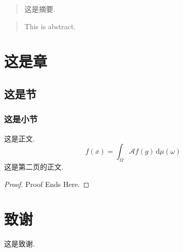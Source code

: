 \documentclass[oneside]{fduthesis2023}
\begin{document}
  \takeCareOfPageNumbers %

  \begin{abstract}
    这是摘要.
  \end{abstract}
  
  \changeToEnglishAbstract
  \begin{abstract}
    This is abstract.
  \end{abstract}

  \makeTableOfContents %

  \startMainPart
  \chapter{这是章}
    \section{这是节}
      \subsection{这是小节}
        这是正文.
        $$
          f(x)=\int_{\Omega}\mathscr{A}f(g)\,\mathrm{d}\mu(\omega)
        $$
        \newpage
        这是第二页的正文.
        \begin{proof}
          Proof Ends Here.
        \end{proof}

  \backmatter
  \chapter*{致谢}
  \renewcommand{\thepage}{}
    这是致谢.

  \clearpage
\end{document}
